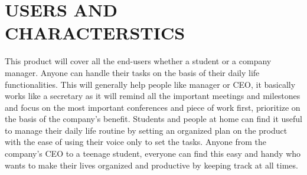 \documentclass[12pt, a4paper]{report}
\begin{document}
\section{USERS AND CHARACTERSTICS  }
This product will cover all the end-users whether a student or a company manager. Anyone can handle their tasks on the basis of their daily life functionalities. This will generally help people like manager or CEO, it basically works like a secretary as it will remind all the important meetings and milestones and focus on the most important conferences and piece of work first, prioritize on the basis of the company's benefit.
Students and people at home can find it useful to manage their daily life routine by setting an organized plan on the product with the ease of using their voice only to set the tasks. Anyone from the company's CEO to a teenage student, everyone can find this easy and handy who wants to make their lives organized and productive by keeping track at all times.
\end{document}
